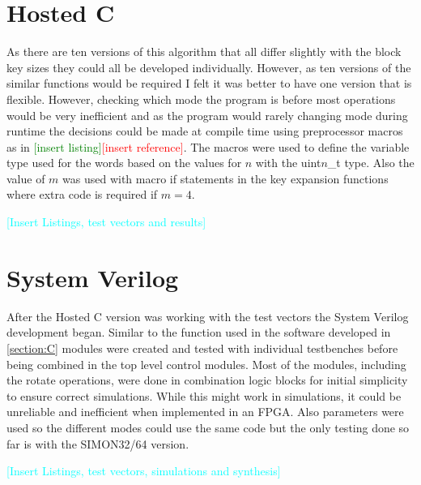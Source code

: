 \documentclass[12pt,twoside,a4paper]{report}
\begin{document}
    \section{Hosted C}
    \label{section:C}
    As there are ten versions of this algorithm that all differ slightly with the block key sizes they could all be developed individually. However, as ten versions of the similar functions would be required I felt it was better to have one version that is flexible. However, checking which mode the program is before most operations would be very inefficient and as the program would rarely changing mode during runtime the decisions could be made at compile time using preprocessor macros as in \textcolor{green}{[insert listing]}\textcolor{red}{[insert reference]}. The macros were used to define the variable type used for the words based on the values for $n$ with the uint$n$\_t type. Also the value of $m$ was used with macro if statements in the key expansion functions where extra code is required if $m = 4$.
    
    \textcolor{cyan}{[Insert Listings, test vectors and results]}
    
    \section{System Verilog}
    After the Hosted C version was working with the test vectors the System Verilog development began. Similar to the function used in the software developed in \autoref{section:C} modules were created and tested with individual testbenches before being combined in the top level control modules. Most of the modules, including the rotate operations, were done in combination logic blocks for initial simplicity to ensure correct simulations. While this might work in simulations, it could be unreliable and inefficient when implemented in an FPGA. Also parameters were used so the different modes could use the same code but the only testing done so far is with the SIMON32/64 version.
    
    \textcolor{cyan}{[Insert Listings, test vectors, simulations and synthesis]}
    
\end{document}
